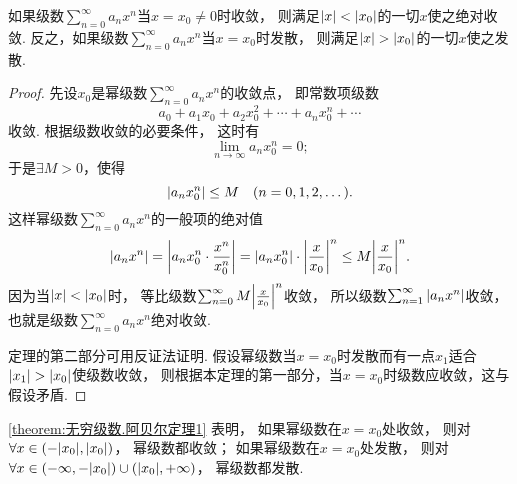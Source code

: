 \begin{theorem}[阿贝尔第一定理]\label{theorem:无穷级数.阿贝尔定理1}
如果级数\(\sum_{n=0}^\infty a_n x^n\)当\(x=x_0\neq0\)时收敛，
则满足\(\abs{x}<\abs{x_0}\)的一切\(x\)使之绝对收敛.
反之，如果级数\(\sum_{n=0}^\infty a_n x^n\)当\(x=x_0\)时发散，
则满足\(\abs{x}>\abs{x_0}\)的一切\(x\)使之发散.
\begin{proof}
先设\(x_0\)是幂级数\(\sum_{n=0}^\infty a_n x^n\)的收敛点，
即常数项级数\begin{equation*}
	a_0 + a_1 x_0 + a_2 x_0^2 + \dotsb + a_n x_0^n + \dotsb
\end{equation*}收敛.
根据级数收敛的必要条件，
这时有\begin{equation*}
	\lim_{n\to\infty} a_n x_0^n = 0;
\end{equation*}
于是\(\exists M > 0\)，使得\begin{equation*}
	\abs{a_n x_0^n} \leq M
	\quad(n=0,1,2,\dotsc).
\end{equation*}
这样幂级数\(\sum_{n=0}^\infty a_n x^n\)的一般项的绝对值\begin{equation*}
	\abs{a_n x^n} = \abs{a_n x_0^n \cdot \frac{x^n}{x_0^n}}
	= \abs{a_n x_0^n} \cdot \abs{\frac{x}{x_0}}^n
	\leq M \abs{\frac{x}{x_0}}^n.
\end{equation*}
因为当\(\abs{x}<\abs{x_0}\)时，
等比级数\(\sum_{n=0}^\infty M \abs{\frac{x}{x_0}}^n\)收敛，
所以级数\(\sum_{n=1}^\infty \abs{a_n x^n}\)收敛，
也就是级数\(\sum_{n=0}^\infty a_n x^n\)绝对收敛.

定理的第二部分可用反证法证明.
假设幂级数当\(x=x_0\)时发散而有一点\(x_1\)适合\(\abs{x_1}>\abs{x_0}\)使级数收敛，
则根据本定理的第一部分，当\(x=x_0\)时级数应收敛，这与假设矛盾.
\end{proof}
\end{theorem}

\cref{theorem:无穷级数.阿贝尔定理1} 表明，
如果幂级数在\(x=x_0\)处收敛，
则对\(\forall x\in(-\abs{x_0},\abs{x_0})\)，
幂级数都收敛；
如果幂级数在\(x=x_0\)处发散，
则对\(\forall x\in(-\infty,-\abs{x_0})\cup(\abs{x_0},+\infty)\)，
幂级数都发散.

